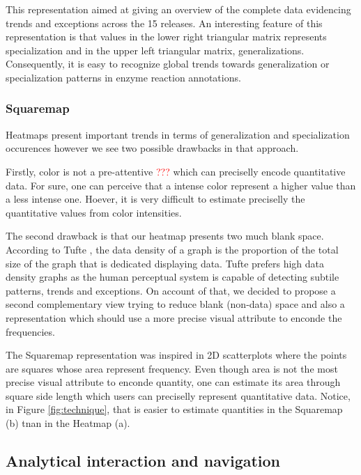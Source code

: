 This representation aimed at giving an overview of the complete data evidencing trends and exceptions across the 15 releases. An interesting feature of this representation is that values in the lower right triangular matrix represents specialization and in the upper left triangular matrix, generalizations. Consequently, it is easy to recognize global trends towards generalization or specialization patterns in enzyme reaction annotations.

\subsubsection{Squaremap}
\label{squaremap}

Heatmaps present important trends in terms of generalization and specialization occurences however we see two possible drawbacks in that approach. 

Firstly, color is not a pre-attentive \textcolor{red}{???} which can preciselly encode quantitative data. For sure, one can perceive that a intense color represent a higher value than a less intense one. Hoever, it is very difficult to estimate preciselly the quantitative values from color intensities. 

The second drawback is that our heatmap presents two much blank space. According to Tufte \cite{tufte_envisioning}, the data density of a graph is the proportion of the total size of the graph that is dedicated displaying data. Tufte prefers high data density graphs as the human perceptual system is capable of detecting subtile patterns, trends and exceptions. On account of that, we decided to propose a second complementary view trying to reduce blank (non-data) space and also a representation which should use a more precise visual attribute to enconde the frequencies. 

The Squaremap representation was inspired in 2D scatterplots where the points are squares whose area represent frequency. Even though area is not the most precise visual attribute to enconde quantity, one can estimate its area through square side length which users can preciselly represent quantitative data. Notice, in Figure \ref{fig:technique}, that is easier to estimate quantities in the Squaremap (b) tnan in the Heatmap (a).

\subsection{Analytical interaction and navigation}

